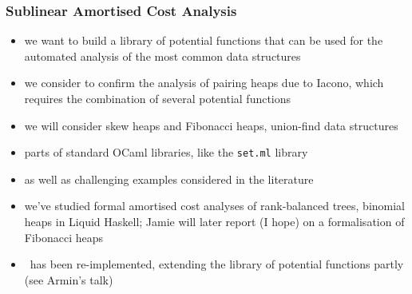 \documentclass[
11pt,
usepdftitle=false,
aspectratio=169,
xcolor={table,usenames,dvipsnames},
]{beamer}
\newcommand{\BLUE}[1]{{\color{blue}#1}}
\begin{document}
\begin{frame}
  \frametitle{Sublinear Amortised Cost Analysis}
  \vspace{-1ex}
  \begin{itemize}
  \item we want to build a library of potential functions that can be used for the automated analysis of the most common data structures
  \end{itemize}

  \medskip
  
  \begin{itemize}
  \item we consider to confirm the analysis of \BLUE{pairing heaps} due to Iacono, which requires the combination of several potential functions
  \item we will consider \BLUE{skew heaps} and \BLUE{Fibonacci heaps}, \BLUE{union-find data structures}
  \item parts of standard OCaml libraries, like the \texttt{set.ml} library
  \item as well as challenging examples considered in the literature
  \end{itemize}

  \medskip
  
  \begin{itemize}
  \item we've studied formal amortised cost analyses of \alert{rank-balanced trees}, \alert{binomial heaps}
    in Liquid Haskell; Jamie will later report (I hope) on a formalisation of \alert{Fibonacci heaps}
  \item \atlas\ has been re-implemented, extending the library of potential functions partly (see Armin's talk)
  \end{itemize}
\end{frame}
\end{document}
